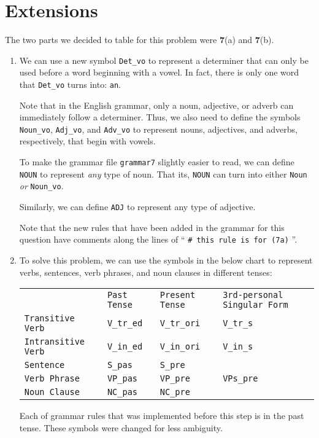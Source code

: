 \documentclass[11pt]{article}
\newcommand{\code}[1]{\texttt{#1}}
\begin{document}
\section{Extensions}
The two parts we decided to table for this problem were \textbf{7}(a) and \textbf{7}(b).
\begin{enumerate}
\item
	We can use a new symbol \code{Det\_vo} to represent a determiner that can only be used before a word beginning with a vowel. In fact, there is only one word that \code{Det\_vo} turns into: \code{an}.
	
Note that in the English grammar, only a noun, adjective, or adverb can immediately follow a determiner.
Thus, we also need to define the symbols \code{Noun\_vo}, \code{Adj\_vo}, and \code{Adv\_vo} to represent nouns, adjectives, and adverbs, respectively, that begin with vowels.

To make the grammar file \code{grammar7} slightly easier to read, we can define \code{NOUN} to represent \textit{any} type of noun. That its, \code{NOUN} can turn into either \code{Noun} \textit{or} \code{Noun\_vo}.

Similarly, we can define \code{ADJ} to represent any type of adjective. 

Note that the new rules that have been added in the grammar for this question have comments along the lines of `` \code{\# this rule is for (7a)} ''.
\item
	To solve this problem, we can use the symbols in the below chart to represent verbs, sentences, verb phrases, and noun clauses in different tenses:
\begin{center} \begin{tabular}{l l l l}
    &                              \code{Past Tense} & \code{Present Tense} & \code{3rd-personal Singular Form}  \\
\code{Transitive Verb}   & \code{V\_tr\_ed} & \code{V\_tr\_ori}  & \code{V\_tr\_s} \\
\code{Intransitive Verb} & \code{V\_in\_ed} & \code{V\_in\_ori} & \code{V\_in\_s} \\
\code{Sentence}            & \code{S\_pas}     & \code{S\_pre}      &     \\
\code{Verb Phrase}       & \code{VP\_pas}   & \code{VP\_pre}   & \code{VPs\_pre} \\
\code{Noun Clause}      & \code{NC\_pas}   & \code{NC\_pre}  &                            \\
\end{tabular}\end{center}
	Each of grammar rules that was implemented before this step is in the past tense. These symbols were changed for less ambiguity.
	

\end{enumerate}
\end{document}
